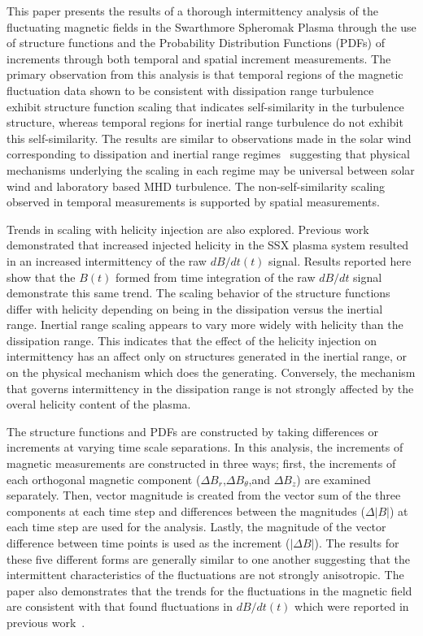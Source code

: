\documentclass[aps,prl,amsmath,amssymb,reprint,superscriptaddress]{revtex4-1} %
\begin{document}
This paper presents the results of a thorough intermittency analysis of the fluctuating magnetic fields in the Swarthmore Spheromak Plasma through the use of structure functions and the Probability Distribution Functions (PDFs) of increments through both temporal and spatial increment measurements. The primary observation from this analysis is that temporal regions of the magnetic fluctuation data shown to be consistent with dissipation range turbulence~\cite{schaffner2014c} exhibit structure function scaling that indicates self-similarity in the turbulence structure, whereas temporal regions for inertial range turbulence do not exhibit this self-similarity. The results are similar to observations made in the solar wind corresponding to dissipation and inertial range regimes~\cite{kiyani2013} suggesting that physical mechanisms underlying the scaling in each regime may be universal between solar wind and laboratory based MHD turbulence. The non-self-similarity scaling observed in temporal measurements is supported by spatial measurements.

Trends in scaling with helicity injection are also explored. Previous work~\cite{schaffner2014b} demonstrated that increased injected helicity in the SSX plasma system resulted in an increased intermittency of the raw $dB/dt(t)$ signal. Results reported here show that the $B(t)$ formed from time integration of the raw $dB/dt$ signal demonstrate this same trend. The scaling behavior of the structure functions differ with helicity depending on being in the dissipation versus the inertial range. Inertial range scaling appears to vary more widely with helicity than the dissipation range. This indicates that the effect of the helicity injection on intermittency has an affect only on structures generated in the inertial range, or on the physical mechanism which does the generating. Conversely, the mechanism that governs intermittency in the dissipation range is not strongly affected by the overal helicity content of the plasma.

The structure functions and PDFs are constructed by taking differences or increments at varying time scale separations. In this analysis, the increments of magnetic measurements are constructed in three ways; first, the increments of each orthogonal magnetic component ($\Delta B_r$,$\Delta B_{\theta}$,and $\Delta B_z$) are examined separately. Then, vector magnitude is created from the vector sum of the three components at each time step and differences between the magnitudes ($\Delta |B|$) at each time step are used for the analysis. Lastly, the magnitude of the vector difference between time points is used as the increment ($|\Delta B|$). The results for these five different forms are generally similar to one another suggesting that the intermittent characteristics of the fluctuations are not strongly anisotropic. The paper also demonstrates that the trends for the fluctuations in the magnetic field are consistent with that found fluctuations in $dB/dt(t)$ which were reported in previous work~\cite{schaffner2014a,schaffner2014b}.
\end{document}
